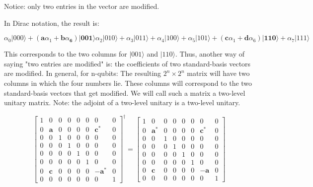 \documentclass[main.tex]{subfiles}
\begin{document}
    Notice: only two entries in the vector are modified.
    
    In Dirac notation, the result is:
    
    $$
    \alpha_{0}|000\rangle+\left(\mathbf{a} \alpha_{1}+\mathbf{b} \alpha_{\mathbf{6}}\right)|\mathbf{0 0 1}\rangle \alpha_{2}|010\rangle+\alpha_{3}|011\rangle+\alpha_{4}|100\rangle+\alpha_{5}|101\rangle+\left(\mathbf{c} \alpha_{1}+\mathbf{d} \alpha_{6}\right)|\mathbf{1 1 0}\rangle+\alpha_{7}|111\rangle
    $$
    
    This corresponds to the two columns for $|001\rangle$ and $|110\rangle$. Thus, another way of saying "two entries are modified" is: the coefficients of two standard-basis vectors are modified. In general, for n-qubits: The resulting $2^{n} \times 2^{n}$ matrix will have two columns in which the four numbers lie. These columns will correspond to the two standard-basis vectors that get modified. We will call such a matrix a two-level unitary matrix. Note: the adjoint of a two-level unitary is a two-level unitary.
    
    $$
    \left[\begin{array}{cccccccc}
    1 & 0 & 0 & 0 & 0 & 0 & 0 & 0 \\
    0 & \mathbf{a} & 0 & 0 & 0 & 0 & \mathbf{c}^{*} & 0 \\
    0 & 0 & 1 & 0 & 0 & 0 & 0 & 0 \\
    0 & 0 & 0 & 1 & 0 & 0 & 0 & 0 \\
    0 & 0 & 0 & 0 & 1 & 0 & 0 & 0 \\
    0 & 0 & 0 & 0 & 0 & 1 & 0 & 0 \\
    0 & \mathbf{c} & 0 & 0 & 0 & 0 & -\mathbf{a}^{*} & 0 \\
    0 & 0 & 0 & 0 & 0 & 0 & 0 & 1
    \end{array}\right]^{\dagger}=\left[\begin{array}{cccccccc}
    1 & 0 & 0 & 0 & 0 & 0 & 0 & 0 \\
    0 & \mathbf{a}^{*} & 0 & 0 & 0 & 0 & \mathbf{c}^{*} & 0 \\
    0 & 0 & 1 & 0 & 0 & 0 & 0 & 0 \\
    0 & 0 & 0 & 1 & 0 & 0 & 0 & 0 \\
    0 & 0 & 0 & 0 & 1 & 0 & 0 & 0 \\
    0 & 0 & 0 & 0 & 0 & 1 & 0 & 0 \\
    0 & \mathbf{c} & 0 & 0 & 0 & 0 & -\mathbf{a} & 0 \\
    0 & 0 & 0 & 0 & 0 & 0 & 0 & 1
    \end{array}\right]
    $$
    
\end{document}
